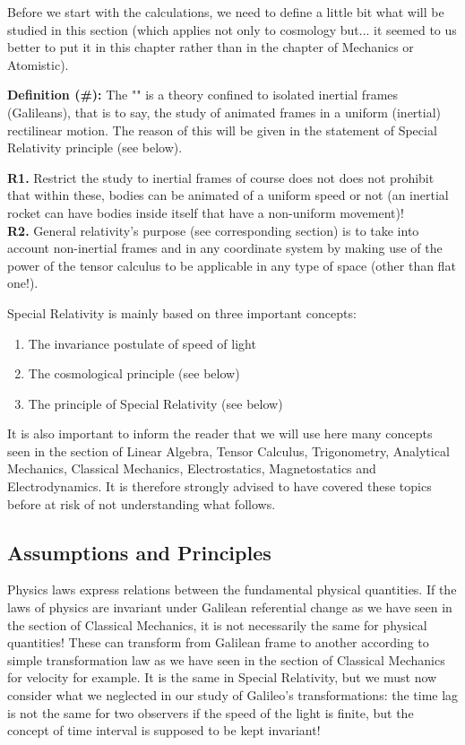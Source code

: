 	Before we start with the calculations, we need to define a little bit what will be studied in this section (which applies not only to cosmology but... it seemed to us better to put it in this chapter rather than in the chapter of Mechanics or Atomistic).
	
	\textbf{Definition (\#\mydef):} The "" is a theory confined to isolated inertial frames (Galileans), that is to say, the study of animated frames in a uniform (inertial) rectilinear motion. The reason of this will be given in the statement of Special Relativity principle (see below).
	
	\begin{tcolorbox}[title=Remarks,colframe=black,arc=10pt]
	\textbf{R1.} Restrict the study to inertial frames of course does not does not prohibit that within these, bodies can be animated of a uniform speed or not (an inertial rocket can have bodies inside itself that have a non-uniform movement)!\\
	
	\textbf{R2.} General relativity's purpose (see corresponding section) is to take into account non-inertial frames and in any coordinate system by making use of the power of the tensor calculus to be applicable in any type of space (other than flat one!).
	\end{tcolorbox}	
	Special Relativity is mainly based on three important concepts:
	\begin{enumerate}
		\item The invariance postulate of speed of light
		\item The cosmological principle (see below)
		\item The principle of Special Relativity (see below)
	\end{enumerate}
	It is also important to inform the reader that we will use here many concepts seen in the section of Linear Algebra, Tensor Calculus, Trigonometry, Analytical Mechanics, Classical Mechanics, Electrostatics, Magnetostatics and Electrodynamics. It is therefore strongly advised to have covered these topics before at risk of not understanding what follows.
	
	\subsection{Assumptions and Principles}\label{special relativity assumptions and principles}
	Physics laws express relations between the fundamental physical quantities. If the laws of physics are invariant under Galilean referential change as we have seen in the section of Classical Mechanics, it is not necessarily the same for physical quantities! These can transform from Galilean frame to another according to  simple transformation law as we have seen in the section of Classical Mechanics for velocity for example. It is the same in Special Relativity, but we must now consider what we neglected in our study of Galileo's transformations: the time lag is not the same for two observers if the speed of the light is finite, but the concept of time interval is supposed to be kept invariant!
	
